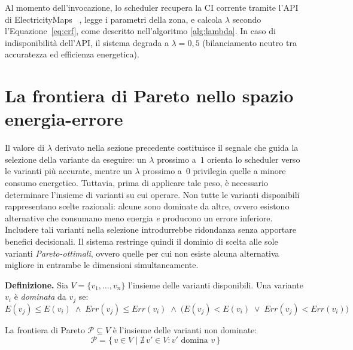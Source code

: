 Al momento dell'invocazione, lo scheduler recupera la CI
corrente tramite l'API di ElectricityMaps~\cite{electricitymaps2024}
, legge i parametri della zona, e calcola $\lambda$ secondo
l'Equazione~\eqref{eq:crf}, come descritto nell'algoritmo \autoref{alg:lambda}. In caso di indisponibilità dell'API,
il sistema degrada a $\lambda = 0{,}5$ (bilanciamento neutro tra
accuratezza ed efficienza energetica).

\section{La frontiera di Pareto nello spazio energia-errore}
\label{sec:pareto}

Il valore di $\lambda$ derivato nella sezione precedente costituisce
il segnale che guida la selezione della variante da eseguire: un
$\lambda$ prossimo a~$1$ orienta lo scheduler verso le varianti più
accurate, mentre un $\lambda$ prossimo a~$0$ privilegia quelle a
minore consumo energetico. Tuttavia, prima di applicare tale peso,
è necessario determinare l'insieme di varianti su cui operare.
Non tutte le varianti disponibili rappresentano scelte razionali:
alcune sono dominate da altre, ovvero esistono alternative che
consumano meno energia \emph{e} producono un errore inferiore.
Includere tali varianti nella selezione introdurrebbe ridondanza
senza apportare benefici decisionali.
Il sistema restringe quindi il dominio di scelta alle sole varianti
\emph{Pareto-ottimali}, ovvero quelle per cui non esiste alcuna
alternativa migliore in entrambe le dimensioni simultaneamente.

\medskip
\noindent\textbf{Definizione.}
Sia $V = \{v_1, \ldots, v_n\}$ l'insieme delle varianti disponibili.
Una variante $v_i$ è \emph{dominata} da $v_j$ se:
%
\begin{equation}
    E(v_j) \leq E(v_i) \;\wedge\;
    \mathit{Err}(v_j) \leq \mathit{Err}(v_i)
    \;\wedge\;
    \bigl(E(v_j) < E(v_i) \;\vee\;
          \mathit{Err}(v_j) < \mathit{Err}(v_i)\bigr)
    \label{eq:dominanza}
\end{equation}

La frontiera di Pareto $\mathcal{P} \subseteq V$ è l'insieme delle
varianti non dominate:
%
\begin{equation}
    \mathcal{P} = \bigl\{\, v \in V \;\big|\;
        \nexists\, v' \in V : v' \text{ domina } v \,\bigr\}
    \label{eq:pareto}
\end{equation}

